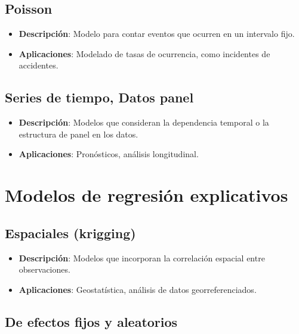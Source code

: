 \documentclass[
  letterpaper,
  DIV=11,
  numbers=noendperiod]{scrreprt}
\providecommand{\tightlist}{%
  \setlength{\itemsep}{0pt}\setlength{\parskip}{0pt}}\usepackage{longtable,booktabs,array}
\begin{document}
\subsection{Poisson}\label{poisson}

\begin{itemize}
\tightlist
\item
  \textbf{Descripción}: Modelo para contar eventos que ocurren en un
  intervalo fijo.
\item
  \textbf{Aplicaciones}: Modelado de tasas de ocurrencia, como
  incidentes de accidentes.
\end{itemize}

\subsection{Series de tiempo, Datos
panel}\label{series-de-tiempo-datos-panel}

\begin{itemize}
\tightlist
\item
  \textbf{Descripción}: Modelos que consideran la dependencia temporal o
  la estructura de panel en los datos.
\item
  \textbf{Aplicaciones}: Pronósticos, análisis longitudinal.
\end{itemize}

\section{Modelos de regresión
explicativos}\label{modelos-de-regresiuxf3n-explicativos-3}

\subsection{Espaciales (krigging)}\label{espaciales-krigging}

\begin{itemize}
\tightlist
\item
  \textbf{Descripción}: Modelos que incorporan la correlación espacial
  entre observaciones.
\item
  \textbf{Aplicaciones}: Geostatística, análisis de datos
  georreferenciados.
\end{itemize}

\subsection{De efectos fijos y
aleatorios}\label{de-efectos-fijos-y-aleatorios}
\end{document}
